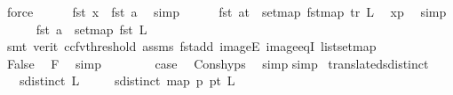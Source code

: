 \begin{isabellebody}
\ force\isanewline
\ \ \ \ \isamarkupfalse%
\ {\isachardoublequoteopen}fst\ x\ {\isacharequal}{\kern0pt}\ fst\ a{\isachardoublequoteclose}\ \isamarkupfalse%
\ simp\isanewline
\ \ \ \ \isamarkupfalse%
\ {\isachardoublequoteopen}fst\ {\isacharparenleft}{\kern0pt}a{\isacharplus}{\kern0pt}t{\isacharparenright}{\kern0pt}\ {\isasymin}\ set{\isacharparenleft}{\kern0pt}map\ fst{\isacharparenleft}{\kern0pt}map\ tr\ L{\isacharparenright}{\kern0pt}{\isacharparenright}{\kern0pt}{\isachardoublequoteclose}\ \isamarkupfalse%
\ xp{\isacharparenleft}{\kern0pt}{}{\isacharparenright}{\kern0pt}\ \isamarkupfalse%
\ simp\isanewline
\ \ \ \ \isamarkupfalse%
\ {\isachardoublequoteopen}fst\ a\ {\isasymin}\ set{\isacharparenleft}{\kern0pt}map\ fst\ L{\isacharparenright}{\kern0pt}{\isachardoublequoteclose}\isanewline
\ \ \ \ \ \ \isamarkupfalse%
\ {\isacharparenleft}{\kern0pt}smt\ {\isacharparenleft}{\kern0pt}verit{\isacharcomma}{\kern0pt}\ ccfv{\isacharunderscore}{\kern0pt}threshold{\isacharparenright}{\kern0pt}\ assms{\isacharparenleft}{\kern0pt}{}{\isacharparenright}{\kern0pt}\ fst{\isacharunderscore}{\kern0pt}add\ imageE\ image{\isacharunderscore}{\kern0pt}eqI\ list{\isachardot}{\kern0pt}set{\isacharunderscore}{\kern0pt}map{\isacharparenright}{\kern0pt}\isanewline
\ \ \ \ \isamarkupfalse%
\ False\ \isamarkupfalse%
\ F{}{\isacharparenleft}{\kern0pt}{}{\isacharparenright}{\kern0pt}\ \isamarkupfalse%
\ simp\isanewline
\ \ \isamarkupfalse%
\isanewline
\ \ \isamarkupfalse%
\ \isamarkupfalse%
\ {\isacharquery}{\kern0pt}case\ \isamarkupfalse%
\ Cons{\isachardot}{\kern0pt}hyps\ \isamarkupfalse%
\ simp\isanewline
{}\isamarkupfalse%
{\isacharparenleft}{\kern0pt}simp{\isacharparenright}{\kern0pt}%
\endisatagproof
{\isafoldproof}%
%
\isadelimproof
\isanewline
%
\endisadelimproof
\isanewline
\isanewline
{}\isamarkupfalse%
\ translated{\isacharunderscore}{\kern0pt}sdistinct{\isacharcolon}{\kern0pt}\isanewline
\ \ \ {\isachardoublequoteopen}sdistinct\ L{\isachardoublequoteclose}\isanewline
\ \ \ \ \ {\isachardoublequoteopen}sdistinct\ {\isacharparenleft}{\kern0pt}map\ {\isacharparenleft}{\kern0pt}{\isasymlambda}p{\isachardot}{\kern0pt}\ p{\isacharplus}{\kern0pt}t{\isacharparenright}{\kern0pt}\ L{\isacharparenright}{\kern0pt}{\isachardoublequoteclose}%

\end{isabellebody}
